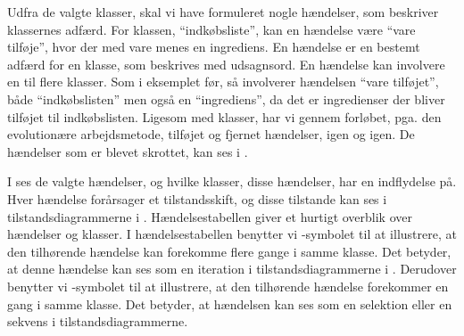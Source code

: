 Udfra de valgte klasser, skal vi have formuleret nogle hændelser, som beskriver klassernes adfærd. For klassen, ``indkøbsliste'', kan en hændelse \fx være ``vare tilføje'', hvor der med vare menes en ingrediens. En hændelse er en bestemt adfærd for en klasse, som beskrives med udsagnsord. En hændelse kan involvere en til flere klasser. Som i eksemplet før, så involverer hændelsen ``vare tilføjet'', både ``indkøbslisten'' men også en ``ingrediens'', da det er ingredienser der bliver tilføjet til indkøbslisten. Ligesom med klasser, har vi gennem forløbet, pga. den evolutionære arbejdsmetode, tilføjet og fjernet hændelser, igen og igen. De hændelser som er blevet skrottet, kan ses i .    

I  ses de valgte hændelser, og hvilke klasser, disse hændelser, har en indflydelse på. Hver hændelse forårsager et tilstandsskift, og disse tilstande kan ses i tilstandsdiagrammerne i . Hændelsestabellen giver et hurtigt overblik over hændelser og klasser. I hændelsestabellen benytter vi \iter-symbolet til at illustrere, at den tilhørende hændelse kan forekomme flere gange i samme klasse. Det betyder, at denne hændelse kan ses som en iteration i tilstandsdiagrammerne i . Derudover benytter vi \once-symbolet til at illustrere, at den tilhørende hændelse forekommer en gang i samme klasse. Det betyder, at hændelsen kan ses som en selektion eller en sekvens i tilstandsdiagrammerne.


